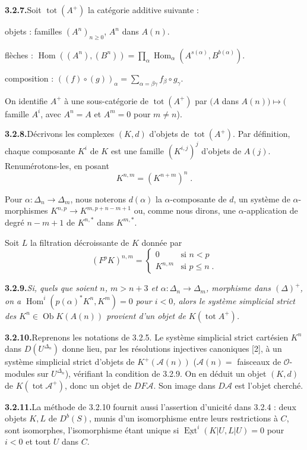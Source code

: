 \documentclass[12pt,a4paper]{article}
\theoremstyle{plain}
\theoremstyle{definition}
\DeclareMathOperator{\Hom}{Hom}
\DeclareMathOperator{\Ext}{Ext}
\DeclareMathOperator{\tot}{tot}
\DeclareMathOperator{\Ob}{Ob}
\begin{document}
\smallskip
\noindent\textbf{3.2.7.}\quad Soit $\tot(A^+)$ la cat\'egorie additive suivante :

objets : familles $(A^n)_{n \geqslant 0}$, $A^n$ dans $A(n)$.

fl\`eches : $\Hom((A^n), (B^n)) = \prod_\alpha \Hom_\alpha(A^{s(\alpha)}, B^{b(\alpha)})$.

composition : $((f) \circ (g))_\alpha = \sum_{\alpha = \beta\gamma} f_\beta \circ g_\gamma$.

On identifie $A^+$ \`a une sous-cat\'egorie de $\tot(A^+)$ par $(A$ dans $A(n)) \longmapsto ($famille $A^i$, avec $A^n = A$ et $A^m = 0$ pour $m \neq n$).

\smallskip
\noindent\textbf{3.2.8.}\quad D\'ecrivons les complexes $(K, d)$ d'objets de $\tot(A^+)$. Par d\'efinition, chaque composante $K^i$ de $K$ est une famille $(K^{i,j})^j$ d'objets de $A(j)$. Renum\'erotons-les, en posant
\[
K^{n,m} = (K^{n+m})^n\;.
\]

Pour $\alpha : \Delta_n \to \Delta_m$, nous noterons $d(\alpha)$ la $\alpha$-composante de $d$, un syst\`eme de $\alpha$-morphismes $K^{n,p} \to K^{m, p+n-m+1}$ ou, comme nous dirons, une $\alpha$-application de degr\'e $n-m+1$ de $K^{n,*}$ dans $K^{m,*}$.

Soit $L$ la filtration d\'ecroissante de $K$ donn\'ee par
\[
(F^p K)^{n,m} = \begin{cases} 0 & \text{si } n < p \\ K^{n,m} & \text{si } p \leqslant n\;. \end{cases}
\]

\smallskip
\noindent\textbf{3.2.9.}\quad \emph{Si, quels que soient $n$, $m > n+3$ et $\alpha : \Delta_n \to \Delta_m$, morphisme dans $(\Delta)^+$, on a $\Hom^i(p(\alpha)^* K^n, K^m) = 0$ pour $i < 0$, alors le syst\`eme simplicial strict des $K^n \in \Ob K(A(n))$ provient d'un objet de $K(\tot A^+)$.}

\smallskip
\noindent\textbf{3.2.10.}\quad Reprenons les notations de 3.2.5. Le syst\`eme simplicial strict cart\'esien $K^n$ dans $D(U^{\Delta_n})$ donne lieu, par les r\'esolutions injectives canoniques [2], \`a un syst\`eme simplicial strict d'objets de $K^+(\mathcal{A}(n))$ ($\mathcal{A}(n) = $ faisceaux de $\mathcal{O}$-modules sur $U^{\Delta_n}$), v\'erifiant la condition de 3.2.9. On en d\'eduit un objet $(K, d)$ de $K(\tot \mathcal{A}^+)$, donc un objet de $DF\mathcal{A}$. Son image dans $D\mathcal{A}$ est l'objet cherch\'e.

\smallskip
\noindent\textbf{3.2.11.}\quad La m\'ethode de 3.2.10 fournit aussi l'assertion d'unicit\'e dans 3.2.4 : deux objets $K, L$ de $D^b(S)$, munis d'un isomorphisme entre leurs restrictions \`a $C$, sont isomorphes, l'isomorphisme \'etant unique si $\underline{\Ext}^i(K|U, L|U) = 0$ pour $i < 0$ et tout $U$ dans $C$.
\end{document}
